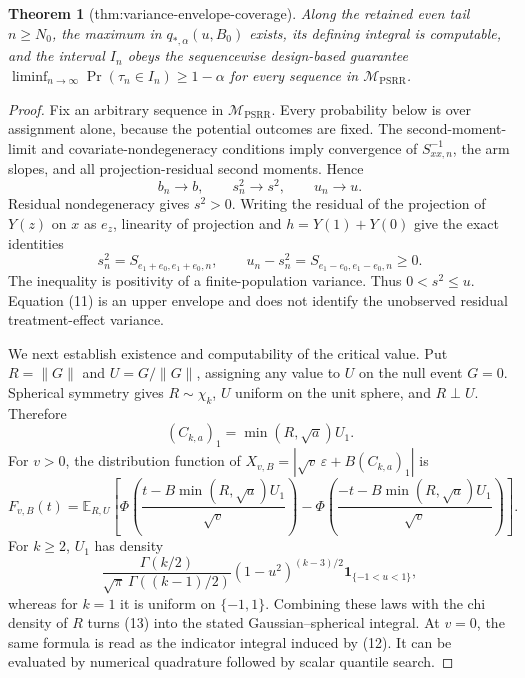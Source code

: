 \documentclass{article}
\newtheorem{theorem}{Theorem}
\begin{document}
\begin{theorem}[thm:variance-envelope-coverage]\label{thm:variance-envelope-coverage}
Along the retained even tail \(n\ge N_0\), the maximum in \(q_{*,\alpha}(u,B_0)\) exists, its defining integral is computable, and the interval \(I_n\) obeys the sequencewise design-based guarantee \(\liminf_{n\to\infty}\Pr(\tau_n\in I_n)\ge1-\alpha\) for every sequence in \(\mathcal M_{\mathrm{PSRR}}\).
\end{theorem}
\begin{proof}
Fix an arbitrary sequence in \(\mathcal M_{\mathrm{PSRR}}\).  Every probability below is over assignment alone, because the potential outcomes are fixed.  The second-moment-limit and covariate-nondegeneracy conditions imply convergence of \(S_{xx,n}^{-1}\), the arm slopes, and all projection-residual second moments.  Hence
\[
 b_n\to b,\qquad s_n^2\to s^2,\qquad u_n\to u. \tag{10}
\]
Residual nondegeneracy gives \(s^2>0\).  Writing the residual of the projection of \(Y(z)\) on \(x\) as \(e_z\), linearity of projection and \(h=Y(1)+Y(0)\) give the exact identities
\[
 s_n^2=S_{e_1+e_0,e_1+e_0,n},\qquad
 u_n-s_n^2=S_{e_1-e_0,e_1-e_0,n}\ge0. \tag{11}
\]
The inequality is positivity of a finite-population variance.  Thus \(0<s^2\le u\).  Equation (11) is an upper envelope and does not identify the unobserved residual treatment-effect variance.

We next establish existence and computability of the critical value.  Put \(R=\|G\|\) and \(U=G/\|G\|\), assigning any value to \(U\) on the null event \(G=0\).  Spherical symmetry gives \(R\sim\chi_k\), \(U\) uniform on the unit sphere, and \(R\perp U\).  Therefore
\[
 (C_{k,a})_1=\min(R,\sqrt a)U_1. \tag{12}
\]
For \(v>0\), the distribution function of
\(X_{v,B}=|\sqrt v\,\varepsilon+B(C_{k,a})_1|\) is
\[
 F_{v,B}(t)=\mathbb E_{R,U}\!\left[
 \Phi\!\left(\frac{t-B\min(R,\sqrt a)U_1}{\sqrt v}\right)
 -\Phi\!\left(\frac{-t-B\min(R,\sqrt a)U_1}{\sqrt v}\right)
 \right]. \tag{13}
\]
For \(k\ge2\), \(U_1\) has density
\[
 \frac{\Gamma(k/2)}{\sqrt\pi\,\Gamma((k-1)/2)}
 (1-u^2)^{(k-3)/2}\mathbf 1_{\{-1<u<1\}},
\]
whereas for \(k=1\) it is uniform on \(\{-1,1\}\).  Combining these laws with the chi density of \(R\) turns (13) into the stated Gaussian--spherical integral.  At \(v=0\), the same formula is read as the indicator integral induced by (12).  It can be evaluated by numerical quadrature followed by scalar quantile search.


\end{proof}
\end{document}
